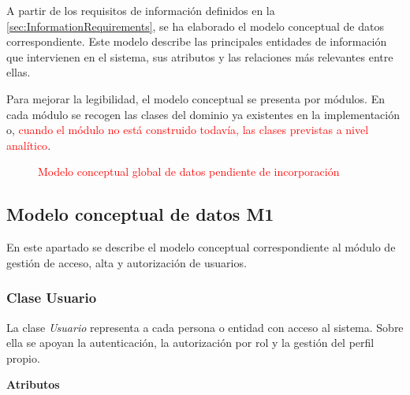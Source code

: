 A partir de los requisitos de información definidos en la \autoref{sec:InformationRequirements}, se ha elaborado el modelo conceptual de datos correspondiente. Este modelo describe las principales entidades de información que intervienen en el sistema, sus atributos y las relaciones más relevantes entre ellas.

Para mejorar la legibilidad, el modelo conceptual se presenta por módulos. En cada módulo se recogen las clases del dominio ya existentes en la implementación o, \textcolor{red}{cuando el módulo no está construido todavía, las clases previstas a nivel analítico}.

\begin{figure}[H]
      \centering
      \caption{\textcolor{red}{Modelo conceptual global de datos pendiente de incorporación}}
      \label{fig:global-conceptual-model}
\end{figure}

\subsection{Modelo conceptual de datos M1}

En este apartado se describe el modelo conceptual correspondiente al módulo de gestión de acceso, alta y autorización de usuarios.

\subsubsection{Clase Usuario}

La clase \textit{Usuario} representa a cada persona o entidad con acceso al sistema. Sobre ella se apoyan la autenticación, la autorización por rol y la gestión del perfil propio.

\textbf{Atributos}

